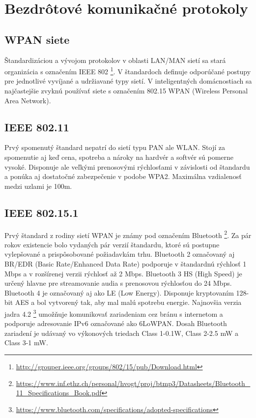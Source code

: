 \documentclass[12pt,a4paper,oneside,openright]{report}
\begin{document}
\section{Bezdrôtové komunikačné protokoly} \label{s_protocols}
\subsection{WPAN siete}
Štandardizáciou a vývojom protokolov v oblasti LAN/MAN sietí sa stará organizácia s označením IEEE
802 \footnote{\url{http://grouper.ieee.org/groups/802/15/pub/Download.html}}. V štandardoch definuje odporúčané postupy pre jednotlivé vyvíjané a udržiavané typy sietí. V
inteligentných domácnostiach sa najčastejšie zvyknú používať siete s označením 802.15 WPAN (Wireless Personal Area Network).
\subsection{IEEE 802.11}
Prvý spomenutý štandard nepatrí do sietí typu PAN ale WLAN. Stojí za spomenutie aj keď cena, spotreba a nároky na hardvér a softvér sú pomerne vysoké. Disponuje ale veľkými prenosovými rýchlosťami v závislosti od štandardu a ponúka aj dostatočné zabezpečenie v podobe WPA2. Maximálna vzdialenosť medzi uzlami je 100m. 
\subsection{IEEE 802.15.1}
Prvý štandard z rodiny sietí WPAN je známy pod označením Bluetooth
\footnote{\url{https://www.inf.ethz.ch/personal/hvogt/proj/btmp3/Datasheets/Bluetooth_11_Specifications_Book.pdf}}. Za pár rokov existencie bolo vydaných pár verzií štandardu, ktoré sú postupne vylepšované a prispôsobované požiadavkám trhu.
Bluetooth 2 označovaný aj BR/EDR (Basic Rate/Enhanced Data Rate) podporuje v štandardnú rýchlosť 1 Mbps a v rozšírenej verzii rýchlosť až 2 Mbps.
Bluetooth 3 HS (High Speed) je určený hlavne pre streamovanie audia s prenosovou rýchlosťou do 24 Mbps.
Bluetooth 4 je označovaný aj ako LE (Low Energy). Disponuje kryptovaním 128-bit AES a bol vytvorený tak, aby mal malú spotrebu energie. Najnovšia verzia jadra 4.2 \footnote{\url{https://www.bluetooth.com/specifications/adopted-specifications}} umožňuje komunikovať zariadeniam cez bránu s internetom a podporuje adresovanie IPv6 označované ako 6LoWPAN.
Dosah Bluetooth zariadení je udávaný vo výkonových triedach Class 1-0.1W, Class 2-2.5 mW a Class 3-1 mW.
\end{document}
